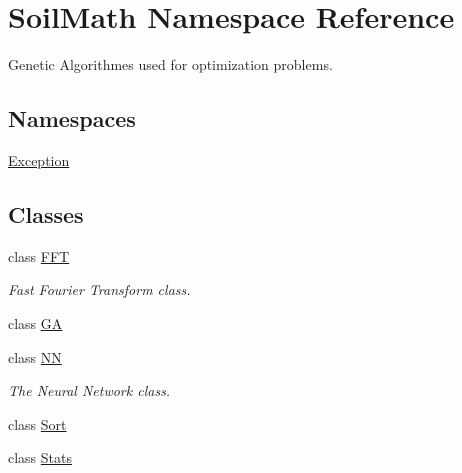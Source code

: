 \hypertarget{namespace_soil_math}{}\section{Soil\+Math Namespace Reference}
\label{namespace_soil_math}


Genetic Algorithmes used for optimization problems.  


\subsection*{Namespaces}
\begin{DoxyCompactItemize}
\item 
 \hyperlink{namespace_soil_math_1_1_exception}{Exception}
\end{DoxyCompactItemize}
\subsection*{Classes}
\begin{DoxyCompactItemize}
\item 
class \hyperlink{class_soil_math_1_1_f_f_t}{F\+F\+T}
\begin{DoxyCompactList}\small\item\em Fast Fourier Transform class. \end{DoxyCompactList}\item 
class \hyperlink{class_soil_math_1_1_g_a}{G\+A}
\item 
class \hyperlink{class_soil_math_1_1_n_n}{N\+N}
\begin{DoxyCompactList}\small\item\em The Neural Network class. \end{DoxyCompactList}\item 
class \hyperlink{class_soil_math_1_1_sort}{Sort}
\item 
class \hyperlink{class_soil_math_1_1_stats}{Stats}
\end{DoxyCompactItemize}
